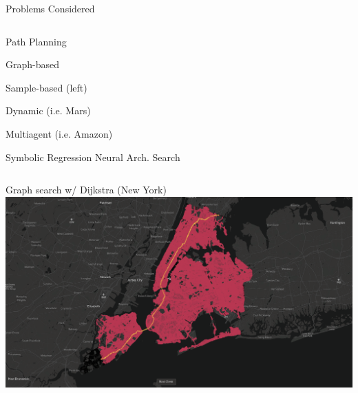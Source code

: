 \documentclass[aspectratio=169]{beamer}
\makeatletter
\renewcommand{\emphasis}[1]{{\Huge \color{pureminimalistic@text@red} #1}}
\newcommand{\white}[1]{{\color{pureminimalistic@text@white} #1}}
\makeatother
\begin{document}
\begin{frame}[plain]{\white{Problems Considered}}
\begin{columns}[T]
\begin{column}{.5\linewidth}
          \emphasis{Path Planning}
          \begin{vfilleditems}
              \item {\Large Graph-based}
              \vspace{1em}
              \item {\Large Sample-based \Medium (left)}
              \vspace{1em}
              \item {\color{grey} {\Large Dynamic (i.e. Mars)}}
              \vspace{1em}
              \item {\color{grey} {\Large Multiagent (i.e. Amazon)}}
          \end{vfilleditems}
          \vspace{1em}
          {\color{grey} {\Large Symbolic Regression}}
          \vspace{1em}
          {\color{grey} {\Large Neural Arch. Search}}
      \end{column}
  \end{columns}
\end{frame}

\begin{frame}[plain]{Graph search w/ Dijkstra \white{(New York)}}
    \includegraphics[width=1.0\linewidth, keepaspectratio, trim={0cm, 2cm, 1cm, 0.5cm}, clip]{figures/ny_graph_based.png}
\end{frame}
\end{document}
